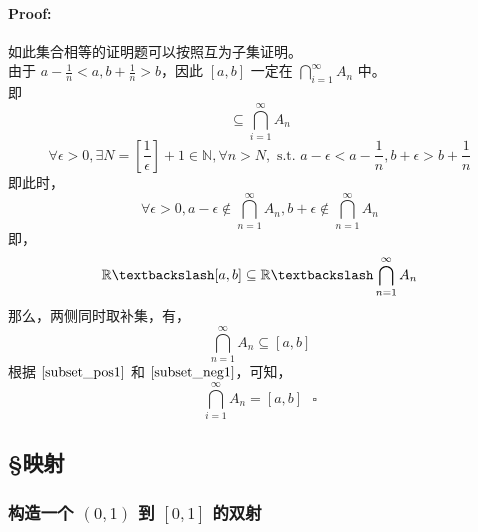 \documentclass{article}
\begin{document}
\paragraph{Proof:} 
如此集合相等的证明题可以按照互为子集证明。\\
由于 $a - \frac{1}{n} < a, b + \frac{1}{n} > b$，因此 $[a, b]$ 一定在 $\bigcap_{i=1}^{\infty}A_n$ 中。\\
即 
\begin{equation}
    [a, b] \subseteq \bigcap_{i=1}^{\infty}A_n
    \label{subset_pos1}
\end{equation}
\begin{equation*}
    \forall \epsilon > 0, \exists N = [\frac{1}{\epsilon}] + 1 \in \mathbb{N}, \forall n > N, \text{ s.t. } a - \epsilon < a - \frac{1}{n}, b + \epsilon > b + \frac{1}{n}
\end{equation*}
即此时，
\begin{equation*}
    \forall \epsilon > 0, a - \epsilon \notin \bigcap_{n=1}^{\infty}A_n, b + \epsilon \notin \bigcap_{n=1}^{\infty}A_n
\end{equation*}
即，
\begin{equation*}
    \mathbb{R} \textbackslash [a, b] \subseteq \mathbb{R} \textbackslash \bigcap_{n=1}^{\infty}A_n
\end{equation*}
那么，两侧同时取补集，有，
\begin{equation}
    \bigcap_{n=1}^{\infty}A_n \subseteq [a, b]
    \label{subset_neg1}
\end{equation}
根据 $\ref{subset_pos1}$ 和 $\ref{subset_neg1}$，可知，
\begin{equation*}
    \bigcap_{i=1}^{\infty}A_n = [a, b] \text{ } \square
\end{equation*}
\subsection{\S 映射}
\subsubsection{构造一个 $(0, 1)$ 到 $[0, 1]$ 的双射}
\end{document}
